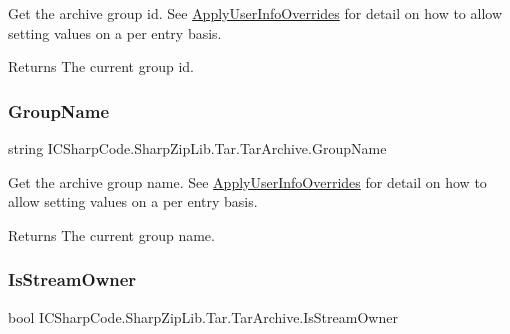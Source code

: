 Get the archive group id. See \hyperlink{class_i_c_sharp_code_1_1_sharp_zip_lib_1_1_tar_1_1_tar_archive_a94d90eb52245f63a5ad06fb0289104ff}{Apply\+User\+Info\+Overrides} for detail on how to allow setting values on a per entry basis. 

\begin{DoxyReturn}{Returns}
The current group id. 
\end{DoxyReturn}
\mbox{\label{class_i_c_sharp_code_1_1_sharp_zip_lib_1_1_tar_1_1_tar_archive_a326999cdbcfc9285fd468e136d791809}} 
\subsubsection{\texorpdfstring{Group\+Name}{GroupName}}
{\footnotesize\ttfamily string I\+C\+Sharp\+Code.\+Sharp\+Zip\+Lib.\+Tar.\+Tar\+Archive.\+Group\+Name\hspace{0.3cm}{\ttfamily [get]}}



Get the archive group name. See \hyperlink{class_i_c_sharp_code_1_1_sharp_zip_lib_1_1_tar_1_1_tar_archive_a94d90eb52245f63a5ad06fb0289104ff}{Apply\+User\+Info\+Overrides} for detail on how to allow setting values on a per entry basis. 

\begin{DoxyReturn}{Returns}
The current group name. 
\end{DoxyReturn}
\mbox{\label{class_i_c_sharp_code_1_1_sharp_zip_lib_1_1_tar_1_1_tar_archive_a664546e5e899006e6a3c48331ffa95ed}} 
\subsubsection{\texorpdfstring{Is\+Stream\+Owner}{IsStreamOwner}}
{\footnotesize\ttfamily bool I\+C\+Sharp\+Code.\+Sharp\+Zip\+Lib.\+Tar.\+Tar\+Archive.\+Is\+Stream\+Owner\hspace{0.3cm}{\ttfamily [set]}}




